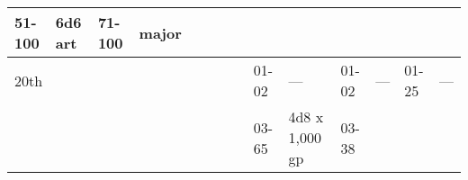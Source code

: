 \begin{longtable}{llllllllllllll}
{\begin{minipage}[t]{0.923in}
51-100\end{minipage}} & \multicolumn{1}{p{0.469in}|}{\begin{minipage}[t]{0.469in}\raggedright
6d6 art\end{minipage}} & \multicolumn{1}{p{0.626in}|}{\begin{minipage}[t]{0.626in}\raggedright
71-100\end{minipage}} & \multicolumn{1}{p{0.469in}|}{\begin{minipage}[t]{0.469in}\centering
1 major\end{minipage}}\\
\hline
\multicolumn{8}{p{1.150in}|}{\begin{minipage}[t]{1.150in}\centering
20th\end{minipage}} & \multicolumn{1}{|p{0.393in}|}{\begin{minipage}[t]{0.393in}\raggedright
01-02\end{minipage}} & \multicolumn{1}{p{0.469in}|}{\begin{minipage}[t]{0.469in}\raggedright
---\end{minipage}} & \multicolumn{1}{p{0.923in}|}{\begin{minipage}[t]{0.923in}\raggedright
01-02\end{minipage}} & \multicolumn{1}{p{0.469in}|}{\begin{minipage}[t]{0.469in}\raggedright
---\end{minipage}} & \multicolumn{1}{p{0.626in}|}{\begin{minipage}[t]{0.626in}\raggedright
01-25\end{minipage}} & \multicolumn{1}{p{0.469in}|}{\begin{minipage}[t]{0.469in}\centering
---\end{minipage}}\\
\hline
\multicolumn{8}{p{1.150in}|}{\begin{minipage}[t]{1.150in}\centering
\end{minipage}} & \multicolumn{1}{|p{0.393in}|}{\begin{minipage}[t]{0.393in}\raggedright
03-65\end{minipage}} & \multicolumn{1}{p{0.469in}|}{\begin{minipage}[t]{0.469in}\raggedright
4d8 x 1,000 gp\end{minipage}} & \multicolumn{1}{p{0.923in}|}{\begin{minipage}[t]{0.923in}\raggedright
03-38\end{minipage}} & \multicolumn{1}{p{0.469in}|}{\begin{minipage}[t]{0.469in}\raggedright

\end{minipage}}
\end{longtable}
